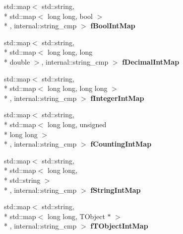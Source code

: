 \begin{DoxyCompactItemize}
\item 
\hypertarget{class_h_a_l_1_1_analysis_data_a61184b1f5c3fe3a707ca6636ae9e13b0}{std\+::map$<$ std\+::string, \\*
std\+::map$<$ long long, bool $>$\\*
, internal\+::string\+\_\+cmp $>$ {\bfseries f\+Bool\+Int\+Map}}\label{class_h_a_l_1_1_analysis_data_a61184b1f5c3fe3a707ca6636ae9e13b0}

\item 
\hypertarget{class_h_a_l_1_1_analysis_data_af0f5c30034eba37c74179ea605623317}{std\+::map$<$ std\+::string, \\*
std\+::map$<$ long long, long \\*
double $>$, internal\+::string\+\_\+cmp $>$ {\bfseries f\+Decimal\+Int\+Map}}\label{class_h_a_l_1_1_analysis_data_af0f5c30034eba37c74179ea605623317}

\item 
\hypertarget{class_h_a_l_1_1_analysis_data_a62e023cb60a954070f043edd7dd77f75}{std\+::map$<$ std\+::string, \\*
std\+::map$<$ long long, long long $>$\\*
, internal\+::string\+\_\+cmp $>$ {\bfseries f\+Integer\+Int\+Map}}\label{class_h_a_l_1_1_analysis_data_a62e023cb60a954070f043edd7dd77f75}

\item 
\hypertarget{class_h_a_l_1_1_analysis_data_aa4f71b630137b5723ded88314a9301a0}{std\+::map$<$ std\+::string, \\*
std\+::map$<$ long long, unsigned \\*
long long $>$\\*
, internal\+::string\+\_\+cmp $>$ {\bfseries f\+Counting\+Int\+Map}}\label{class_h_a_l_1_1_analysis_data_aa4f71b630137b5723ded88314a9301a0}

\item 
\hypertarget{class_h_a_l_1_1_analysis_data_a68da09e7d00969715c53c1286d480c27}{std\+::map$<$ std\+::string, \\*
std\+::map$<$ long long, \\*
std\+::string $>$\\*
, internal\+::string\+\_\+cmp $>$ {\bfseries f\+String\+Int\+Map}}\label{class_h_a_l_1_1_analysis_data_a68da09e7d00969715c53c1286d480c27}

\item 
\hypertarget{class_h_a_l_1_1_analysis_data_a30331566889aaa845bd3edd475211cfc}{std\+::map$<$ std\+::string, \\*
std\+::map$<$ long long, T\+Object $\ast$ $>$\\*
, internal\+::string\+\_\+cmp $>$ {\bfseries f\+T\+Object\+Int\+Map}}\label{class_h_a_l_1_1_analysis_data_a30331566889aaa845bd3edd475211cfc}


\end{DoxyCompactItemize}
